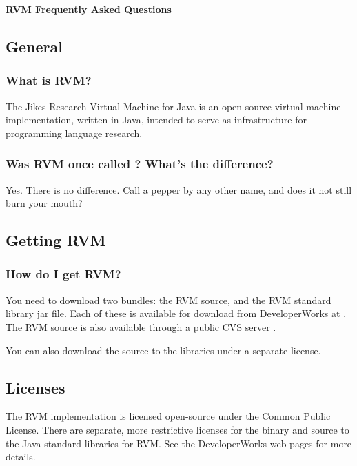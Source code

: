 \begin{center}
{\bf RVM Frequently Asked Questions}
\end{center}

\subsection{General}

\subsubsection{What is RVM?}

The Jikes Research Virtual Machine for Java is an open-source virtual machine
implementation, written in Java, intended to serve as infrastructure for
programming language research.

\subsubsection{Was RVM once called \jp? What's the difference?}

Yes. There is no difference.  Call a pepper by any other name, and does it
not still burn your mouth?

\subsection{Getting RVM}

\subsubsection{How do I get RVM?}

You need to download two bundles: the RVM source, and the RVM standard library
jar file.  Each of these is available for download from DeveloperWorks at
.  
The RVM source is also available through a public CVS server 
. 

You can also download the source to the libraries  under
a separate license. 

\subsection{Licenses}

The RVM implementation is licensed open-source under the Common Public
License.  There are separate, more restrictive licenses 
for the binary and 
source to the Java standard libraries for RVM.  See the DeveloperWorks
web pages for more details. 


